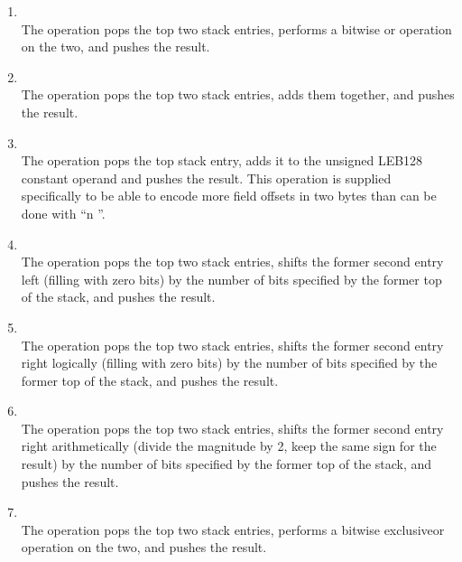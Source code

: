 \begin{enumerate}[1]
\item  {} \\
The  operation pops the top two stack entries, performs
a bitwise or operation on the two, and pushes the result.

\item  {} \\
The  operation pops the top two stack entries,
adds them together, and pushes the result.

\item  {} \\
The  operation pops the top stack entry,
adds it to the unsigned LEB128 constant operand and pushes
the result.  This operation is supplied specifically to be
able to encode more field offsets in two bytes than can be
done with “n ”.

\item {} \\
The  operation pops the top two stack entries,
shifts the former second entry left (filling with zero bits)
by the number of bits specified by the former top of the stack,
and pushes the result.

\item {} \\
The  operation pops the top two stack entries,
shifts the former second entry right logically (filling with
zero bits) by the number of bits specified by the former top
of the stack, and pushes the result.

\item {} \\
The  operation pops the top two stack entries,
shifts the former second entry right arithmetically (divide
the magnitude by 2, keep the same sign for the result) by
the number of bits specified by the former top of the stack,
and pushes the result.

\item {} \\
The  operation pops the top two stack entries,
performs a bitwise exclusive\dash or operation on the two, and
pushes the result.

\end{enumerate}

